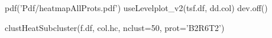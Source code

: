 \documentclass[a4paper]{article}
\begin{document}
\title{}
\author{}

\maketitle





pdf('Pdf/heatmapAllProts.pdf')
useLevelplot_v2(tsf.df, dd.col)
dev.off()

clustHeatSubcluster(f.df, col.hc, nclust=50, prot='B2R6T2')
\end{document}
